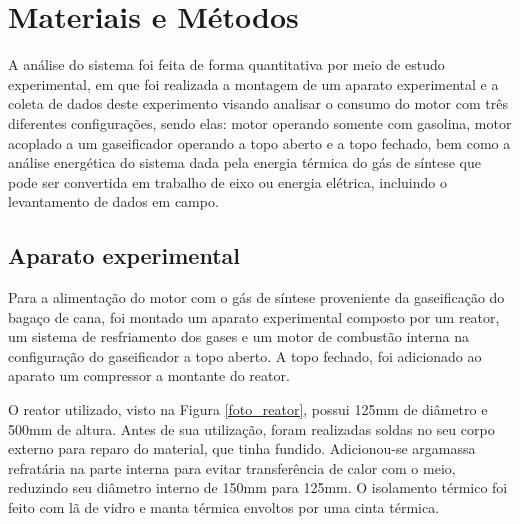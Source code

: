 \chapter[Materiais e métodos]{Materiais e Métodos}

A análise do sistema foi feita de forma quantitativa por meio de estudo experimental, em que foi realizada a montagem de um aparato experimental e a coleta de dados deste experimento visando analisar o consumo do motor com três diferentes configurações, sendo elas: motor operando somente com gasolina, motor acoplado a um gaseificador operando a topo aberto e a topo fechado, bem como a análise energética do sistema dada pela energia térmica do gás de síntese que pode ser convertida em trabalho de eixo ou energia elétrica, incluindo o levantamento de dados em campo.

\section{Aparato experimental}
Para a alimentação do motor com o gás de síntese proveniente da gaseificação do bagaço de cana, foi montado um aparato experimental composto por um reator, um sistema de resfriamento dos gases e um motor de combustão interna na configuração do gaseificador a topo aberto. A topo fechado, foi adicionado ao aparato um compressor a montante do reator.

O reator utilizado, visto na Figura \ref{foto_reator}, possui 125mm de diâmetro e 500mm de altura. Antes de sua utilização, foram realizadas soldas no seu corpo externo para reparo do material, que tinha fundido. Adicionou-se argamassa refratária na parte interna para evitar transferência de calor com o meio, reduzindo seu diâmetro interno de 150mm para 125mm. O isolamento térmico foi feito com lã de vidro e manta térmica envoltos por uma cinta térmica.

